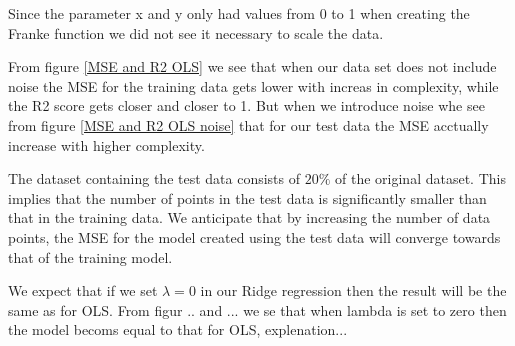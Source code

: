 \thispagestyle{plain}

\noindent Since the parameter x and y only had values from 0 to 1 when creating the 
Franke function we did not see it necessary to scale the data.

\noindent From figure \eqref{MSE and R2 OLS} we see that when our data set does not include noise
the MSE for the training data gets lower with increas in complexity, while 
the R2 score gets closer and closer to 1. But when we introduce noise whe see from figure \eqref{MSE and R2 OLS noise}
that for our test data the MSE acctually increase with higher complexity. 

The dataset containing the test data consists of $20\%$ of the original
dataset. This implies that the number of points in the test data is 
significantly smaller than that in the training data. We anticipate 
that by increasing the number of data points, the MSE for the model 
created using the test data will converge towards that of the training
model.

We expect that if we set $\lambda = 0$ in our Ridge regression then the result 
will be the same as for OLS. From figur .. and ... we se that when lambda is 
set to zero then the model becoms equal to that for OLS, explenation...